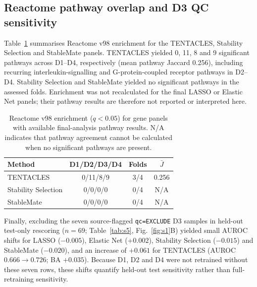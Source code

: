 \subsection{Reactome pathway overlap and D3 QC sensitivity}
\label{sec:results_pathways}
Table~\ref{tab:results_pathways} summarises Reactome v98 enrichment for the TENTACLES, Stability Selection and StableMate panels. TENTACLES yielded 0, 11, 8 and 9 significant pathways across D1--D4, respectively (mean pathway Jaccard 0.256), including recurring interleukin-signalling and G-protein-coupled receptor pathways in D2--D4. Stability Selection and StableMate yielded no significant pathways in the assessed folds. Enrichment was not recalculated for the final LASSO or Elastic Net panels; their pathway results are therefore not reported or interpreted here.

\begin{table}[!t]
\caption{Reactome v98 enrichment ($q<0.05$) for gene panels with available final-analysis pathway results. N/A indicates that pathway agreement cannot be calculated when no significant pathways are present.}
\label{tab:results_pathways}
\centering\footnotesize
\setlength{\tabcolsep}{3.5pt}
\begin{tabular}{@{}lccc@{}}
\toprule
Method & D1/D2/D3/D4 & Folds & $\bar{J}$\\
\midrule
TENTACLES & 0/11/8/9 & 3/4 & 0.256\\
Stability Selection & 0/0/0/0 & 0/4 & N/A\\
StableMate & 0/0/0/0 & 0/4 & N/A\\
\bottomrule
\end{tabular}
\end{table}

Finally, excluding the seven source-flagged \texttt{qc=EXCLUDE} D3 samples in held-out test-only rescoring ($n=69$; Table~\ref{tab:s5}, Fig.~\ref{fig:s1}B) yielded small AUROC shifts for LASSO ($-0.005$), Elastic Net ($+0.002$), Stability Selection ($-0.015$) and StableMate ($-0.020$), and an increase of $+0.061$ for TENTACLES (AUROC $0.666 \to 0.726$; BA $+0.035$). Because D1, D2 and D4 were not retrained without these seven rows, these shifts quantify held-out test sensitivity rather than full-retraining sensitivity.

